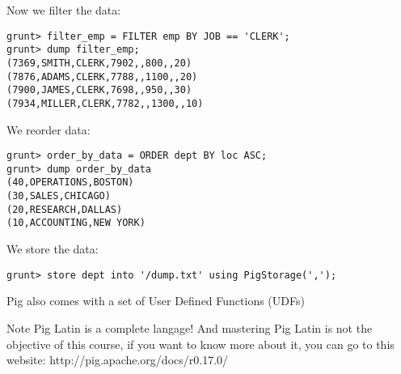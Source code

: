\documentclass{beamer}[10pt, usepdftitle=false handout]
\begin{document}
\begin{frame}[fragile]
Now we filter the data:

\vspace*{0.6em}
\begingroup
\fontsize{6pt}{10pt}\selectfont
\begin{verbatim}
grunt> filter_emp = FILTER emp BY JOB == 'CLERK';
grunt> dump filter_emp;
(7369,SMITH,CLERK,7902,,800,,20)
(7876,ADAMS,CLERK,7788,,1100,,20)
(7900,JAMES,CLERK,7698,,950,,30)
(7934,MILLER,CLERK,7782,,1300,,10)
\end{verbatim}
\endgroup

We reorder data:
\vspace*{0.6em}
\begingroup
\fontsize{6pt}{10pt}\selectfont
\begin{verbatim}
grunt> order_by_data = ORDER dept BY loc ASC;
grunt> dump order_by_data
(40,OPERATIONS,BOSTON)
(30,SALES,CHICAGO)
(20,RESEARCH,DALLAS)
(10,ACCOUNTING,NEW YORK)
\end{verbatim}
\endgroup

We store the data:
\vspace*{0.6em}
\begingroup
\fontsize{6pt}{10pt}\selectfont
\begin{verbatim}
grunt> store dept into '/dump.txt' using PigStorage(',');
\end{verbatim}
\endgroup

\end{frame}
\begin{frame}
Pig also comes with a set of User Defined Functions (UDFs)

\begin{center}
\end{center}

\begin{block}{Note}
Pig Latin is a complete langage! And mastering Pig Latin is not the objective of this course, if you want to know more about it, you can go to this website: http://pig.apache.org/docs/r0.17.0/
\end{block}


\end{frame}
\end{document}
